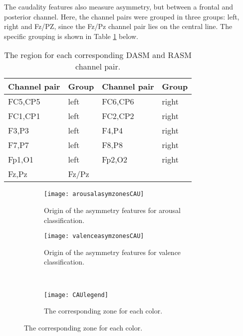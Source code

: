 \npar

The caudality features also measure asymmetry, but between a frontal and posterior channel. Here, the channel pairs were grouped in three groups: left, right and Fz/PZ, since the Fz/Pz channel pair lies on the central line. The specific grouping is shown in Table \ref{CAUgroupTable} below.

\begin{table}[H]
\centering
\caption{The region for each corresponding DASM and RASM channel pair\label{CAUgroupTable}.}
\begin{tabular}{ll|ll}
\textbf{Channel pair} & \textbf{Group} & \textbf{Channel pair} & \textbf{Group} \\ \hline
FC5,CP5               & left           & FC6,CP6               & right          \\
FC1,CP1               & left           & FC2,CP2               & right          \\
F3,P3                 & left           & F4,P4                 & right          \\
F7,P7                 & left           & F8,P8                 & right          \\
Fp1,O1                & left           & Fp2,O2                & right          \\
Fz,Pz                 & Fz/Pz          &                       &                \\
\end{tabular}
\end{table}

\begin{figure}[H]
\centering
  \begin{subfigure}[b]{.4\textwidth}
    \texttt{[image: arousalasymzonesCAU]}
    \caption{Origin of the asymmetry features for arousal classification.\label{arousalasymzonesCAU}}
  \end{subfigure}
\hfill
  \begin{subfigure}[b]{.4\textwidth}
    \texttt{[image: valenceasymzonesCAU]}
    \caption{Origin of the asymmetry features for valence classification.\label{valenceasymzonesCAU}}
  \end{subfigure}
\\
  \begin{subfigure}[b]{.5\textwidth}
    \texttt{[image: CAUlegend]}
    \caption{The corresponding zone for each color.\label{CAUlegend}}
  \end{subfigure}
\end{figure}

